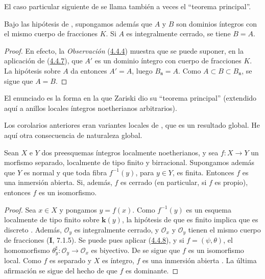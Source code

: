 El caso particular siguiente de  se llama también a
veces el ``teorema principal''.

\begin{corollary}[4.4.8]
\label{III.4.4.8}
\label{III.4.4.8-fr}
Bajo las hipótesis de , supongamos además que $A$ y
$B$ son dominios íntegros con el mismo cuerpo de fracciones $K$.
Si $A$ es
integralmente cerrado, se tiene $B=A$.
\end{corollary}

\begin{proof}
En efecto, la \emph{Observación} (\hyperref[III.4.4.4-fr]{4.4.4}) muestra que se puede
suponer, en la aplicación de (\hyperref[III.4.4.7-fr]{4.4.7}), que $A'$ es un dominio íntegro con
cuerpo de fracciones $K$. La hipótesis sobre $A$ da entonces
$A'=A$, luego $B_{\mathfrak n}=A$. Como
$A\subset B\subset B_{\mathfrak n}$, se sigue que $A=B$.
\end{proof}

El enunciado  es la forma en la que Zariski dio su
``teorema principal'' (extendido aquí a anillos locales íntegros
noetherianos arbitrarios).

Los corolarios anteriores eran variantes locales de
, que es un resultado global. He aquí otra
consecuencia de naturaleza global.

\begin{corollary}[4.4.9]
\label{III.4.4.9}
\label{III.4.4.9-fr}
Sean $X$ e $Y$ dos preesquemas íntegros localmente noetherianos, y sea
$f:X\to Y$ un morfismo separado, localmente de tipo finito y birracional.
Supongamos además que $Y$ es normal y que toda fibra $f^{-1}(y)$,
para $y\in Y$, es finita. Entonces $f$ es una inmersión abierta. Si,
además, $f$ es cerrado (en particular, si $f$ es propio), entonces
$f$ es un isomorfismo.
\end{corollary}

\begin{proof}
Sea $x\in X$ y pongamos $y=f(x)$. Como $f^{-1}(y)$ es un esquema
localmente de tipo finito sobre $\boldsymbol{k}(y)$, la hipótesis de que es finito implica que
es discreto . Además, $\mathcal O_y$ es integralmente
cerrado, y $\mathcal O_x$ y $\mathcal O_y$ tienen el mismo cuerpo de fracciones (\textbf{I}, 7.1.5). Se puede pues aplicar (\hyperref[III.4.4.8-fr]{4.4.8}), y si $f=(\psi,\theta)$, el homomorfismo
$\theta_y^\sharp:\mathcal O_y\to\mathcal O_x$
es biyectivo. De  se sigue que $f$ es un isomorfismo
local. Como $f$ es separado y $X$ es íntegro, $f$ es una inmersión
abierta . La última afirmación se sigue del hecho de
que $f$ es dominante.
\end{proof}

